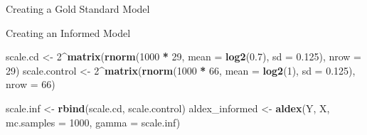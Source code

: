 \documentclass[
  ignorenonframetext,
]{beamer}
\newenvironment{Shaded}{\begin{snugshade}}{\end{snugshade}}
\newcommand{\AttributeTok}[1]{\textcolor[rgb]{0.13,0.29,0.53}{#1}}
\newcommand{\ConstantTok}[1]{\textcolor[rgb]{0.56,0.35,0.01}{#1}}
\newcommand{\ControlFlowTok}[1]{\textcolor[rgb]{0.13,0.29,0.53}{\textbf{#1}}}
\newcommand{\DecValTok}[1]{\textcolor[rgb]{0.00,0.00,0.81}{#1}}
\newcommand{\FloatTok}[1]{\textcolor[rgb]{0.00,0.00,0.81}{#1}}
\newcommand{\FunctionTok}[1]{\textcolor[rgb]{0.13,0.29,0.53}{\textbf{#1}}}
\newcommand{\NormalTok}[1]{#1}
\newcommand{\OtherTok}[1]{\textcolor[rgb]{0.56,0.35,0.01}{#1}}
\newcommand{\SpecialCharTok}[1]{\textcolor[rgb]{0.81,0.36,0.00}{\textbf{#1}}}
\begin{document}
\begin{frame}[fragile]{Creating a Gold Standard Model}
\protect\hypertarget{creating-a-gold-standard-model}{}
\begin{Shaded}
\end{Shaded}
\end{frame}

\begin{frame}[fragile]{Creating an Informed Model}
\protect\hypertarget{creating-an-informed-model}{}
\begin{Shaded}
\begin{Highlighting}[]
\NormalTok{scale.cd }\OtherTok{\textless{}{-}} \DecValTok{2}\SpecialCharTok{\^{}}\FunctionTok{matrix}\NormalTok{(}\FunctionTok{rnorm}\NormalTok{(}\DecValTok{1000} \SpecialCharTok{*} \DecValTok{29}\NormalTok{, }\AttributeTok{mean =} \FunctionTok{log2}\NormalTok{(}\FloatTok{0.7}\NormalTok{), }\AttributeTok{sd =} \FloatTok{0.125}\NormalTok{),}
    \AttributeTok{nrow =} \DecValTok{29}\NormalTok{)}
\NormalTok{scale.control }\OtherTok{\textless{}{-}} \DecValTok{2}\SpecialCharTok{\^{}}\FunctionTok{matrix}\NormalTok{(}\FunctionTok{rnorm}\NormalTok{(}\DecValTok{1000} \SpecialCharTok{*} \DecValTok{66}\NormalTok{, }\AttributeTok{mean =} \FunctionTok{log2}\NormalTok{(}\DecValTok{1}\NormalTok{), }\AttributeTok{sd =} \FloatTok{0.125}\NormalTok{),}
    \AttributeTok{nrow =} \DecValTok{66}\NormalTok{)}

\NormalTok{scale.inf }\OtherTok{\textless{}{-}} \FunctionTok{rbind}\NormalTok{(scale.cd, scale.control)}
\NormalTok{aldex\_informed }\OtherTok{\textless{}{-}} \FunctionTok{aldex}\NormalTok{(Y, X, }\AttributeTok{mc.samples =} \DecValTok{1000}\NormalTok{, }\AttributeTok{gamma =}\NormalTok{ scale.inf)}
\end{Highlighting}
\end{Shaded}
\end{frame}
\end{document}
